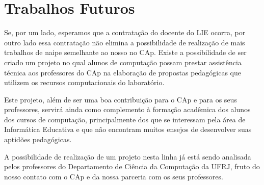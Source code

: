 \section{Trabalhos Futuros}\label{chp:LABEL_CHP_CONC_SEC_TRAB_FUT}

Se, por um lado, esperamos que a contratação do docente do LIE ocorra, por outro lado essa contratação não elimina a possibilidade de realização de mais trabalhos de naipe semelhante ao nosso no CAp. Existe a possibilidade de ser criado um projeto no qual alunos de computação possam prestar assistência técnica aos professores do CAp na elaboração de propostas pedagógicas que utilizem os recursos computacionais do laboratório.

Este projeto, além de ser uma boa contribuição para o CAp e para os seus professores, servirá ainda como complemento à formação acadêmica dos alunos dos cursos de computação, principalmente dos que se interessam pela área de Informática Educativa e que não encontram muitos ensejos de desenvolver suas aptidões pedagógicas.

A possibilidade de realização de um projeto nesta linha já está sendo analisada pelos professores do Departamento de Ciência da Computação da UFRJ, fruto do nosso contato com o CAp e da nossa parceria com os seus professores.
